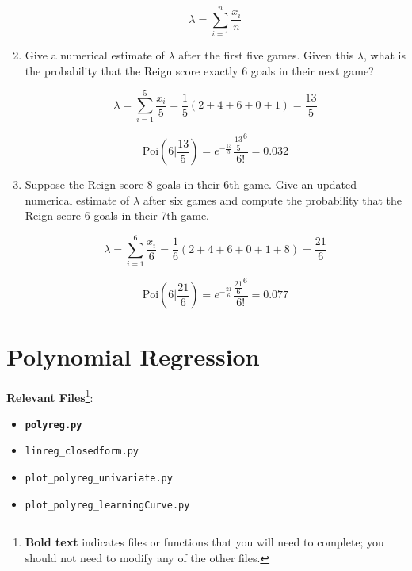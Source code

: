 \documentclass{article}
\begin{document}
\begin{aprob}
\begin{enumerate}
        \begin{equation} 
        \lambda = \sum_{i=1}^{n} \frac{x_i}{n}
        \end{equation} 
        
        \item {} Give a numerical estimate of $\lambda$ after the first five games. Given this $\lambda$, what is the probability that the Reign score exactly $6$ goals in their next game?
        
        \begin{equation} 
        \lambda = \sum_{i=1}^{5} \frac{x_i}{5} = \frac{1}{5}(2 + 4 + 6 + 0 + 1) = \frac{13}{5}
        \end{equation} 
        
        \begin{equation} 
        \mathrm{Poi}(6 | \frac{13}{5}) = e^{-\frac{13}{5}} \frac{\frac{13}{5} ^ 6}{6!} = 0.032
        \end{equation} 
        
        \item {} Suppose the Reign score 8 goals in their 6th game. Give an updated numerical estimate of $\lambda$ after six games and compute the probability that the Reign score $6$ goals in their 7th game.
        
        \begin{equation} 
        \lambda = \sum_{i=1}^{6} \frac{x_i}{6} = \frac{1}{6}(2 + 4 + 6 + 0 + 1 + 8) = \frac{21}{6}
        \end{equation} 
        
        \begin{equation} 
        \mathrm{Poi}(6 | \frac{21}{6}) = e^{-\frac{21}{6}} \frac{\frac{21}{6} ^ 6}{6!} = 0.077
        \end{equation} 
        
    \end{enumerate}
\end{aprob}

\newpage

\section*{Polynomial Regression}
{\bf Relevant Files}\footnote{{\bf Bold text} indicates files or functions that you will need to complete; you should not need to modify any of the other files.}:
\vspace{-1.2em}
\begin{multicols}{2}
    \begin{itemize}[noitemsep,nolistsep]
        \item \texttt{\bf polyreg.py}
        \item \texttt{linreg\_closedform.py}
        \item \texttt{plot\_polyreg\_univariate.py}
        \item \texttt{plot\_polyreg\_learningCurve.py}
    \end{itemize}
\end{multicols}
\end{document}
